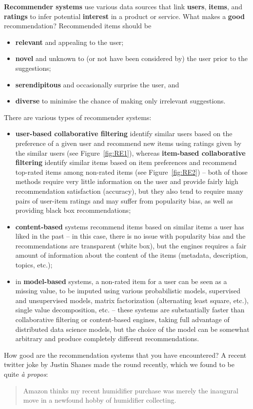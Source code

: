 \textbf{Recommender systems} use various data sources that link \textbf{users}, \textbf{items}, and \textbf{ratings} to infer potential \textbf{interest} in a product or service. What makes a \textbf{good} recommendation? Recommended items should be
\begin{itemize}[noitemsep]
\item \textbf{relevant} and appealing to the user;
\item \textbf{novel} and unknown to (or not have been considered by) the user prior to the suggestions; 
\item \textbf{serendipitous} and occasionally surprise the user, and 
\item \textbf{diverse} to minimise the chance of making only irrelevant suggestions. 
\end{itemize}
There are various types of recommender systems: 
\begin{itemize}[noitemsep]
\item \textbf{user-based collaborative filtering} identify similar users based on the preference of a given user and recommend new items using ratings given by the similar users (see Figure~\ref{fig:RE1}), whereas \textbf{item-based collaborative filtering} identify similar items based on item preferences and recommend top-rated items among non-rated items (see Figure~\ref{fig:RE2}) -- both of those methods require very little information on the user and provide fairly high recommendation satisfaction (accuracy), but they also tend to require many pairs of user-item ratings and may suffer from popularity bias, as well as providing black box recommendations;
\item \textbf{content-based} systems recommend items based on similar items a user has liked in the past -- in this case, there is no issue with popularity bias and the recommendations are transparent (white box), but the engines requires a fair amount of information about the content of the items (metadata, description, topics, etc.);
\item in \textbf{model-based} systems, a non-rated item for a user can be seen as a missing value, to be imputed using various probabilistic models, supervised and unsupervised models, matrix factorization (alternating least square, etc.), single value decomposition, etc. -- these systems are substantially faster than collaborative filtering or content-based engines, taking full advantage of distributed data science models, but the choice of the model can be somewhat arbitrary and produce completely different recommendations. 
\end{itemize}
How good are the recommendation systems that you have encountered? A recent twitter joke by Justin Shanes made the round recently, which we found to be quite \textit{\`a propos}: 
\begin{quote}
Amazon thinks my recent humidifier purchase was merely the inaugural move in a newfound hobby of humidifier collecting.
\end{quote}
